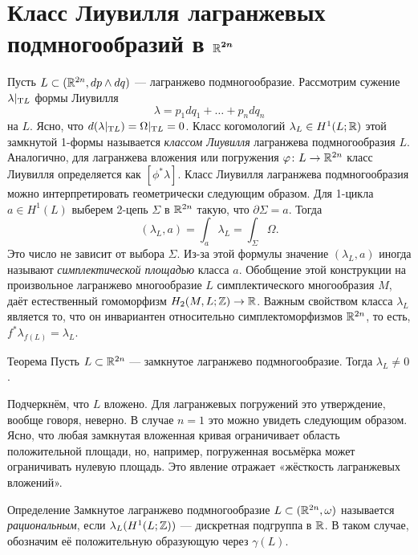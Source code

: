 \section[Класс Лиувилля]{Класс Лиувилля лагранжевых\\подмногообразий в $\bm{\mathbb{R}^{2n}}$}
\label{3.2}
Пусть $L \subset (\mathbb{R}^{2n}, dp \wedge dq)$ — лагранжево подмногообразие.
Рассмотрим сужение $\lambda|_{\mathrm{T} L}$ формы Лиувилля 
\[\lambda = p_1 dq_1+\dots+ p_n dq_n\]
на $L$.
Ясно, что $d (\lambda|_{\mathrm{T} L}) = \Omega|_{\mathrm{T} L} = 0$.
Класс когомологий $\lambda_L\in H^1(L;\mathbb{R})$ этой замкнутой 1-формы называется \emph{классом Лиувилля} лагранжева подмногообразия $L$.
Аналогично, для лагранжева вложения или погружения $\varphi\colon L \to \mathbb{R}^{2n}$ класс Лиувилля определяется как $[\phi^\ast \lambda]$.
Класс Лиувилля лагранжева подмногообразия можно интерпретировать геометрически следующим образом.
Для 1-цикла $a\in H^1 (L)$ выберем 2-цепь $\Sigma$ в $\mathbb{R}^{2n}$ такую, что $\partial\Sigma = a$.
Тогда
\[(\lambda_L, a) = \int_a\lambda_L = \int_\Sigma\Omega.\]
Это число не зависит от выбора $\Sigma$.
Из-за этой формулы значение $(\lambda_L, a)$ иногда называют \emph{симплектической площадью} класса $a$.
Обобщение этой конструкции на произвольное лагранжево многообразие $L$ симплектического многообразия $M$, даёт естественный гомоморфизм $H_2 (M, L; \mathbb{Z}) \to \mathbb{R}$.
Важным свойством класса $\lambda_L$ является то, что он инвариантен относительно симплектоморфизмов $\mathbb{R}^{2n}$,
то есть,
$f^\ast \lambda_{f (L)} = \lambda_L$.

\begin{thm}[(\cite{G1})]{Теорема}\label{3.2.A}
Пусть $L \subset \mathbb{R}^{2n}$ — замкнутое лагранжево подмногообразие.
Тогда $\lambda_L \ne 0$.
\end{thm}

Подчеркнём, что $L$ вложено.
Для лагранжевых погружений это утверждение, вообще говоря, неверно.
В случае $n = 1$ это можно увидеть следующим образом.
Ясно, что любая замкнутая вложенная кривая ограничивает область положительной площади, но, например, погруженная восьмёрка может ограничивать нулевую площадь.
Это явление отражает «жёсткость лагранжевых вложений».

\begin{ex*}{Определение}
Замкнутое лагранжево подмногообразие $L \z\subset (\RR^{2n}, \omega)$
называется \emph{рациональным}, если $\lambda_L (H^1 (L; \mathbb{Z}))$ —
дискретная подгруппа в $\mathbb{R}$.
В таком случае, обозначим её положительную образующую через $\gamma(L)$.
\end{ex*}

